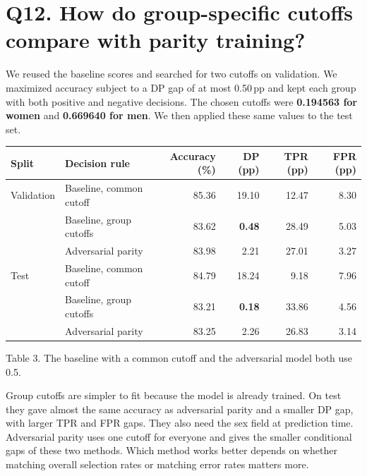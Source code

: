 \documentclass[11pt,letterpaper]{article}
\newcommand{\gap}[1]{#1\,pp}
\newcommand{\question}[2]{\section*{Q#1. #2}}
\begin{document}
\question{12}{How do group-specific cutoffs compare with parity training?}

We reused the baseline scores and searched for two cutoffs on validation. We maximized accuracy subject to a DP gap of at most \gap{0.50} and kept each group with both positive and negative decisions. The chosen cutoffs were \textbf{0.194563 for women} and \textbf{0.669640 for men}. We then applied these same values to the test set.

{\small
\begin{tabularx}{\linewidth}{@{}lLrrrr@{}}
\toprule
Split & Decision rule & Accuracy (\%) & DP (pp) & TPR (pp) & FPR (pp)\\
\midrule
Validation & Baseline, common cutoff & 85.36 & 19.10 & 12.47 & 8.30\\
 & Baseline, group cutoffs & 83.62 & \textbf{0.48} & 28.49 & 5.03\\
 & Adversarial parity & 83.98 & 2.21 & 27.01 & 3.27\\
\addlinespace[2pt]
Test & Baseline, common cutoff & 84.79 & 18.24 & 9.18 & 7.96\\
 & Baseline, group cutoffs & 83.21 & \textbf{0.18} & 33.86 & 4.56\\
 & Adversarial parity & 83.25 & 2.26 & 26.83 & 3.14\\
\bottomrule
\end{tabularx}\par}
{\small\color{muted}Table 3. The baseline with a common cutoff and the adversarial model both use 0.5.\par}

Group cutoffs are simpler to fit because the model is already trained. On test they gave almost the same accuracy as adversarial parity and a smaller DP gap, with larger TPR and FPR gaps. They also need the sex field at prediction time. Adversarial parity uses one cutoff for everyone and gives the smaller conditional gaps of these two methods. Which method works better depends on whether matching overall selection rates or matching error rates matters more.
\end{document}
